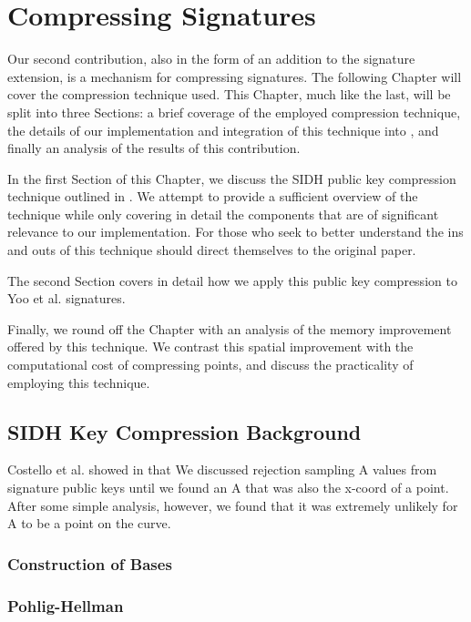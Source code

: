 \chapter{Compressing Signatures}
\label{sec:compress}

Our second contribution, also in the form of an addition to the \sidh signature extension, is a mechanism for compressing signatures. The following Chapter will cover the compression technique used. This Chapter, much like the last, will be split into three Sections: a brief coverage of the employed compression technique, the details of our implementation and integration of this technique into \sidh, and finally an analysis of the results of this contribution.

In the first Section of this Chapter, we discuss the SIDH public key compression technique outlined in \cite{pkcomp}. We attempt to provide a sufficient overview of the technique while only covering in detail the components that are of significant relevance to our implementation. For those who seek to better understand the ins and outs of this technique should direct themselves to the original paper.  

The second Section covers in detail how we apply this public key compression to Yoo et al. signatures. 

Finally, we round off the Chapter with an analysis of the memory improvement offered by this technique. We contrast this spatial improvement with the computational cost of compressing points, and discuss the practicality of employing this technique. 

\section{SIDH Key Compression Background}

Costello et al. showed in \cite{pkcomp} that  
We discussed rejection sampling A values from signature public keys until we found an A that was also the x-coord of a point. After some simple analysis, however, we found that it was extremely unlikely for A to be a point on the curve.

\subsection{Construction of Bases}

\subsection{Pohlig-Hellman}


